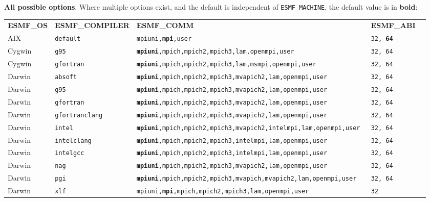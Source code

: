 \vspace{1ex}

{\bf All possible options}. Where multiple options exist, and the default is independent
of {\tt ESMF\_MACHINE}, the default value is in {\bf bold}:

\vspace{1ex}


\begin{longtable}{lllll}
  {\bfseries\footnotesize ESMF\_OS} &{\bfseries\footnotesize ESMF\_COMPILER} & {\bfseries\footnotesize ESMF\_COMM} & {\bfseries\footnotesize ESMF\_ABI} \\

AIX     &\tt default     &\footnotesize \tt mpiuni,{\bf mpi},user      &\tt 32, {\bf 64} \\
Cygwin  &\tt g95         &\footnotesize \tt {\bf mpiuni},mpich,mpich2,mpich3,lam,openmpi,user &\tt 32, 64 \\
Cygwin  &\tt gfortran    &\footnotesize \tt {\bf mpiuni},mpich,mpich2,mpich3,lam,msmpi,openmpi,user &\tt 32, 64 \\
Darwin  &\tt absoft      &\footnotesize \tt {\bf mpiuni},mpich,mpich2,mpich3,mvapich2,lam,openmpi,user &\tt 32, 64 \\
Darwin  &\tt g95         &\footnotesize \tt {\bf mpiuni},mpich,mpich2,mpich3,mvapich2,lam,openmpi,user &\tt 32, 64 \\
Darwin  &\tt gfortran    &\footnotesize \tt {\bf mpiuni},mpich,mpich2,mpich3,mvapich2,lam,openmpi,user &\tt 32, 64 \\
Darwin  &\tt gfortranclang &\footnotesize \tt {\bf mpiuni},mpich,mpich2,mpich3,mvapich2,lam,openmpi,user &\tt 32, 64 \\
Darwin  &\tt intel       &\footnotesize \tt {\bf mpiuni},mpich,mpich2,mpich3,mvapich2,intelmpi,lam,openmpi,user &\tt 32, 64 \\
Darwin  &\tt intelclang  &\footnotesize \tt {\bf mpiuni},mpich,mpich2,mpich3,intelmpi,lam,openmpi,user &\tt 32, 64 \\
Darwin  &\tt intelgcc    &\footnotesize \tt {\bf mpiuni},mpich,mpich2,mpich3,intelmpi,lam,openmpi,user &\tt 32, 64 \\
Darwin  &\tt nag         &\footnotesize \tt {\bf mpiuni},mpich,mpich2,mpich3,mvapich2,lam,openmpi,user &\tt 32, 64 \\
Darwin  &\tt pgi         &\footnotesize \tt {\bf mpiuni},mpich,mpich2,mpich3,mvapich,mvapich2,lam,openmpi,user &\tt 32, 64 \\
Darwin  &\tt xlf         &\footnotesize \tt mpiuni,{\bf mpi},mpich,mpich2,mpich3,lam,openmpi,user &\tt 32 \\

\end{longtable}
